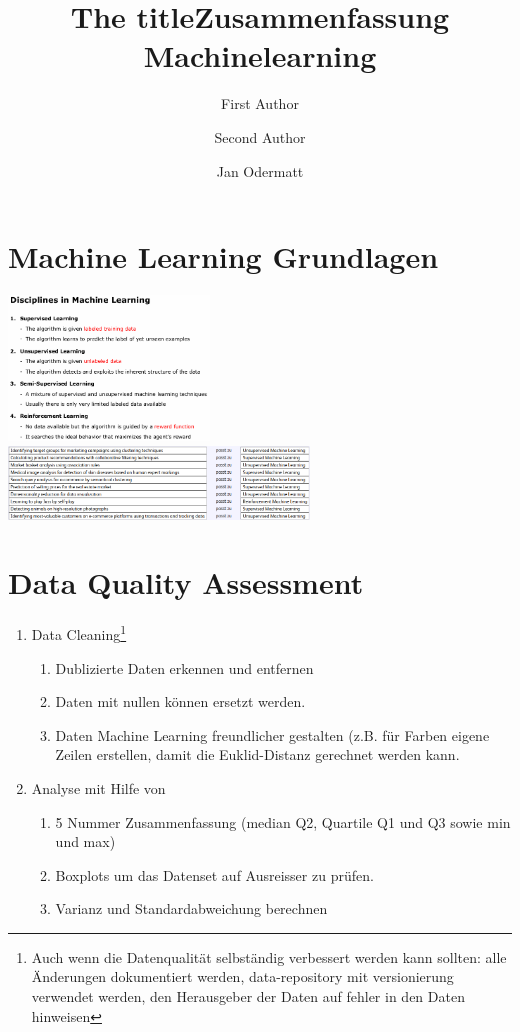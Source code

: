 \documentclass{article}
\author{First Author \and Second Author}
\title{The title}
\author{Jan Odermatt}
\title{Zusammenfassung Machinelearning}
\begin{document}
\tableofcontents
\newpage
\section{Machine Learning Grundlagen}
\includegraphics[width=0.4\textwidth]{disciplines_in_machine_learning.png}
\includegraphics[width=0.6\textwidth]{disciplines_matched.png}
\section{Data Quality Assessment}
	\begin{enumerate}
		\item Data Cleaning\footnote{Auch wenn die Datenqualität selbständig verbessert werden kann sollten: alle Änderungen dokumentiert werden, data-repository mit versionierung verwendet werden, den Herausgeber der Daten auf fehler in den Daten hinweisen}
		\begin{enumerate}
			\item Dublizierte Daten erkennen und entfernen
			\item Daten mit nullen können ersetzt werden.
			\item Daten Machine Learning freundlicher gestalten (z.B. für Farben eigene Zeilen erstellen, damit die Euklid-Distanz gerechnet werden kann.
		\end{enumerate}
		\item Analyse mit Hilfe von
		\begin{enumerate}
		\item 5 Nummer Zusammenfassung (median Q2, Quartile Q1 und Q3 sowie min und max)
		\item Boxplots um das Datenset auf Ausreisser zu prüfen.
		\item Varianz und Standardabweichung berechnen
		\end{enumerate}
	\end{enumerate}
\end{document}
